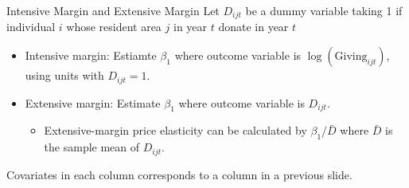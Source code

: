 \documentclass[
  ignorenonframetext,
]{beamer}
\providecommand{\tightlist}{%
  \setlength{\itemsep}{0pt}\setlength{\parskip}{0pt}}
\begin{document}
\begin{frame}{Intensive Margin and Extensive Margin}
\protect\hypertarget{intensive-margin-and-extensive-margin}{}
Let \(D_{ijt}\) be a dummy variable taking 1 if individual \(i\) whose resident area \(j\) in year \(t\) donate in year \(t\)

\begin{itemize}
\tightlist
\item
  Intensive margin: Estiamte \(\beta_1\) where outcome variable is \(\log(\text{Giving}_{ijt})\), using units with \(D_{ijt} = 1\).
\item
  Extensive margin: Estimate \(\beta_1\) where outcome variable is \(D_{ijt}\).

  \begin{itemize}
  \tightlist
  \item
    Extensive-margin price elasticity can be calculated by \(\beta_1/\bar{D}\) where \(\bar{D}\) is the sample mean of \(D_{ijt}\).
  \end{itemize}
\end{itemize}

Covariates in each column corresponds to a column in a previous slide.
\end{frame}
\end{document}
